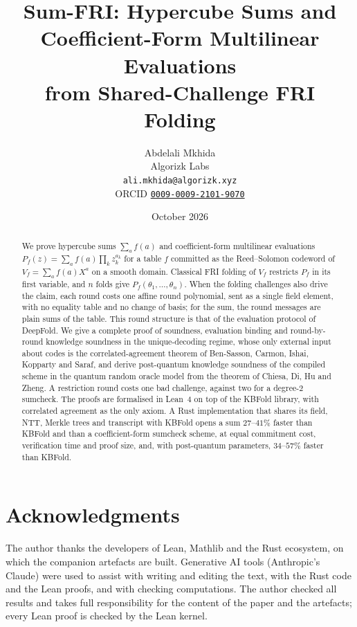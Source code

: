 \documentclass[11pt]{article}
\title{Sum-FRI: Hypercube Sums and Coefficient-Form Multilinear Evaluations\\ from Shared-Challenge FRI Folding}
\author{Abdelali Mkhida\\ Algorizk Labs\\ \texttt{ali.mkhida@algorizk.xyz}\\ ORCID \href{https://orcid.org/0009-0009-2101-9070}{\texttt{0009-0009-2101-9070}}}
\date{October 2026}
\theoremstyle{definition}
\begin{document}
\maketitle

\begin{abstract}
We prove hypercube sums $\sum_a f(a)$ and coefficient-form multilinear evaluations $P_f(z) = \sum_a f(a) \prod_k z_k^{a_k}$ for a table $f$ committed as the Reed--Solomon codeword of $V_f = \sum_a f(a) X^a$ on a smooth domain.
Classical FRI folding of $V_f$ restricts $P_f$ in its first variable, and $n$ folds give $P_f(\theta_1, \dots, \theta_n)$.
When the folding challenges also drive the claim, each round costs one affine round polynomial, sent as a single field element, with no equality table and no change of basis; for the sum, the round messages are plain sums of the table.
This round structure is that of the evaluation protocol of DeepFold.
We give a complete proof of soundness, evaluation binding and round-by-round knowledge soundness in the unique-decoding regime, whose only external input about codes is the correlated-agreement theorem of Ben-Sasson, Carmon, Ishai, Kopparty and Saraf, and derive post-quantum knowledge soundness of the compiled scheme in the quantum random oracle model from the theorem of Chiesa, Di, Hu and Zheng.
A restriction round costs one bad challenge, against two for a degree-$2$ sumcheck.
The proofs are formalised in Lean~4 on top of the KBFold library, with correlated agreement as the only axiom.
A Rust implementation that shares its field, NTT, Merkle trees and transcript with KBFold opens a sum $27$--$41\%$ faster than KBFold and than a coefficient-form sumcheck scheme, at equal commitment cost, verification time and proof size, and, with post-quantum parameters, $34$--$57\%$ faster than KBFold.
\end{abstract}

\tableofcontents











\section*{Acknowledgments}
The author thanks the developers of Lean, Mathlib and the Rust ecosystem, on which the companion artefacts are built.
Generative AI tools (Anthropic's Claude) were used to assist with writing and editing the text, with the Rust code and the Lean proofs, and with checking computations.
The author checked all results and takes full responsibility for the content of the paper and the artefacts; every Lean proof is checked by the Lean kernel.




\appendix


\end{document}
